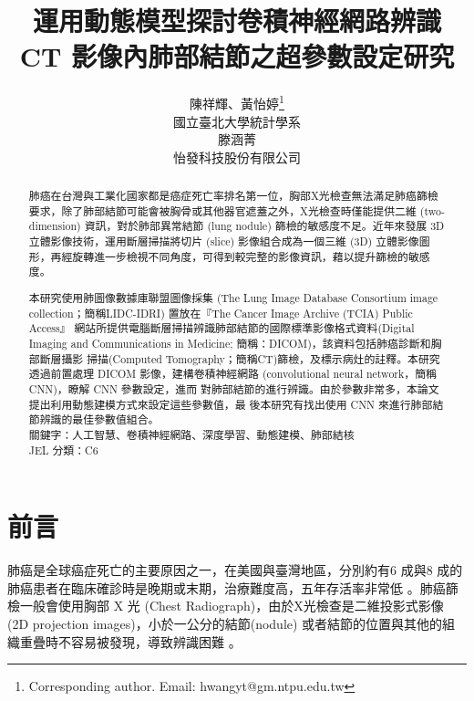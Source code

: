 \documentclass[12pt, a4paper]{article} 				%
\title{運用動態模型探討卷積神經網路辨識 CT 影像內肺部結節之超參數設定研究}
\author{陳祥輝、黃怡婷\footnote{Corresponding author. Email:
hwangyt@gm.ntpu.edu.tw}\\ 國立臺北大學統計學系\\
滕涵菁\\ 怡發科技股份有限公司}
\begin{document}
\maketitle \baselineskip=18pt
\begin{abstract}\baselineskip=18pt
肺癌在台灣與工業化國家都是癌症死亡率排名第一位，胸部X光檢查無法滿足肺癌篩檢要求，除了肺部結節可能會被胸骨或其他器官遮蓋之外，X光檢查時僅能提供二維 (two-dimension) 資訊，對於肺部異常結節 (lung nodule) 篩檢的敏感度不足。近年來發展 3D 立體影像技術，運用斷層掃描將切片 (slice) 影像組合成為一個三維 (3D) 立體影像圖形，再經旋轉進一步檢視不同角度，可得到較完整的影像資訊，藉以提升篩檢的敏感度。

本研究使用肺圖像數據庫聯盟圖像採集 (The Lung Image Database Consortium image
collection；簡稱LIDC-IDRI) 置放在『The Cancer Image Archive (TCIA) Public Access』
網站所提供電腦斷層掃描辨識肺部結節的國際標準影像格式資料(Digital Imaging and
Communications in Medicine; 簡稱：DICOM)，該資料包括肺癌診斷和胸部斷層攝影
掃描(Computed Tomography；簡稱CT)篩檢，及標示病灶的註釋。本研究透過前置處理 DICOM 影像，建構卷積神經網路 (convolutional neural network，簡稱CNN)，瞭解 CNN 參數設定，進而
對肺部結節的進行辨識。由於參數非常多，本論文提出利用動態建模方式來設定這些參數值，最
後本研究有找出使用 CNN 來進行肺部結節辨識的最佳參數值組合。
\\
關鍵字：人工智慧、卷積神經網路、深度學習、動態建模、肺部結核\\
JEL 分類：C6
\end{abstract}
\section{前言}

肺癌是全球癌症死亡的主要原因之一，在美國與臺灣地區，分別約有6 成與8 成的肺癌患者在臨床確診時是晚期或末期，治療難度高，五年存活率非常低 \cite{Chian2016, Putila2011, Wang2013}。肺癌篩檢一般會使用胸部 X 光 (Chest Radiograph)，由於X光檢查是二維投影式影像 (2D projection images)，小於一公分的結節(nodule) 或者結節的位置與其他的組織重疊時不容易被發現，導致辨識困難 \cite{Mizuno2009}。
\end{document}
